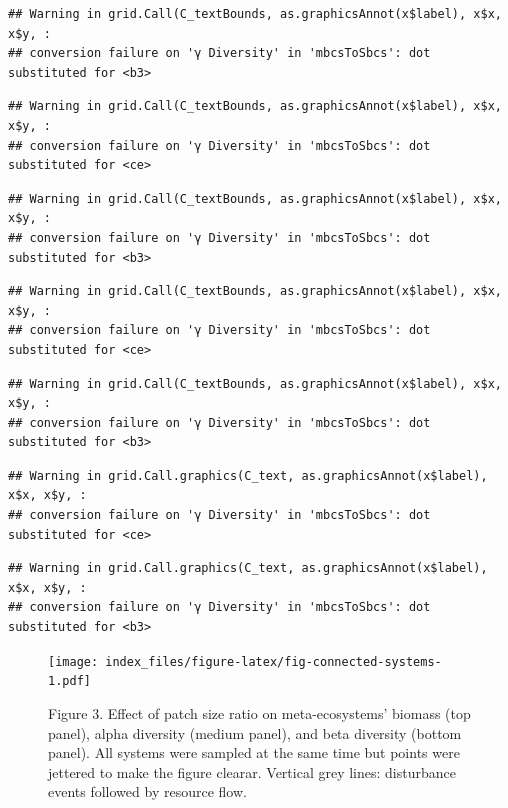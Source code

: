 \documentclass[
]{article}
\begin{document}
\begin{verbatim}
## Warning in grid.Call(C_textBounds, as.graphicsAnnot(x$label), x$x, x$y, :
## conversion failure on 'γ Diversity' in 'mbcsToSbcs': dot substituted for <b3>
\end{verbatim}

\begin{verbatim}
## Warning in grid.Call(C_textBounds, as.graphicsAnnot(x$label), x$x, x$y, :
## conversion failure on 'γ Diversity' in 'mbcsToSbcs': dot substituted for <ce>
\end{verbatim}

\begin{verbatim}
## Warning in grid.Call(C_textBounds, as.graphicsAnnot(x$label), x$x, x$y, :
## conversion failure on 'γ Diversity' in 'mbcsToSbcs': dot substituted for <b3>
\end{verbatim}

\begin{verbatim}
## Warning in grid.Call(C_textBounds, as.graphicsAnnot(x$label), x$x, x$y, :
## conversion failure on 'γ Diversity' in 'mbcsToSbcs': dot substituted for <ce>
\end{verbatim}

\begin{verbatim}
## Warning in grid.Call(C_textBounds, as.graphicsAnnot(x$label), x$x, x$y, :
## conversion failure on 'γ Diversity' in 'mbcsToSbcs': dot substituted for <b3>
\end{verbatim}

\begin{verbatim}
## Warning in grid.Call.graphics(C_text, as.graphicsAnnot(x$label), x$x, x$y, :
## conversion failure on 'γ Diversity' in 'mbcsToSbcs': dot substituted for <ce>
\end{verbatim}

\begin{verbatim}
## Warning in grid.Call.graphics(C_text, as.graphicsAnnot(x$label), x$x, x$y, :
## conversion failure on 'γ Diversity' in 'mbcsToSbcs': dot substituted for <b3>
\end{verbatim}

\begin{figure}
\centering
\texttt{[image: index\_files/figure-latex/fig-connected-systems-1.pdf]}
\caption{Figure 3. Effect of patch size ratio on meta-ecosystems'
biomass (top panel), alpha diversity (medium panel), and beta diversity
(bottom panel). All systems were sampled at the same time but points
were jettered to make the figure clearar. Vertical grey lines:
disturbance events followed by resource flow.}
\end{figure}
\end{document}
